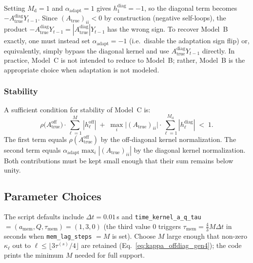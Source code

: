 \documentclass[11pt]{article}
\begin{document}
Setting $M_{\mathrm{d}}=1$ and $\alpha_{\mathrm{adapt}}=1$ gives
$h^{\mathrm{diag}}_1=-1$, so the diagonal term becomes 
$-A_{\text{true}}^{\mathrm{diag}}Y_{t-1}$.
Since $(A_{\text{true}})_{ii}<0$ by construction
(negative self-loops), the product
$-A_{\text{true}}^{\mathrm{diag}}Y_{t-1}
 =|A_{\text{true}}^{\mathrm{diag}}|Y_{t-1}$
has the wrong sign.
To recover Model~B exactly, one must instead set
$\alpha_{\mathrm{adapt}}=-1$ (i.e.\ disable the adaptation sign
flip) or, equivalently, simply bypass the diagonal kernel and use
$A_{\text{true}}^{\mathrm{diag}}Y_{t-1}$ directly.
In practice, Model~C is not intended to reduce to Model~B; rather,
Model~B is the appropriate choice when adaptation is not modeled.

\subsubsection{Stability}

A sufficient condition for stability of Model~C is:
\begin{equation}
  \rho\!\bigl(A_{\text{true}}^{\mathrm{off}}\bigr)
  \cdot\sum_{\ell=1}^{M}|h^{\mathrm{off}}_\ell| 
  \;+\;
  \max_i\bigl|(A_{\text{true}})_{ii}\bigr|
  \cdot\sum_{\ell=1}^{M_{\mathrm{d}}}
        |h^{\mathrm{diag}}_\ell| 
  \;<\; 1.
  \label{eq:stabilityC}
\end{equation}
The first term equals
$\rho(A_{\text{true}}^{\mathrm{off}})$ by the off-diagonal kernel
normalization.
The second term equals
$\alpha_{\mathrm{adapt}}\max_i|(A_{\text{true}})_{ii}|$ by the
diagonal kernel normalization.
Both contributions must be kept small enough that their sum remains
below unity.

\subsection{Parameter Choices}
\label{sec:params}

The script defaults include $\Delta t=0.01$\,s and
\texttt{time\_kernel\_a\_q\_tau} $=(a_{\mathrm{mem}},Q,\tau_{\mathrm{mem}})=(1,3,0)$
(the third value $0$ triggers
$\tau_{\mathrm{mem}}=\tfrac{4}{3}M\Delta t$ in seconds when
\texttt{mem\_lag\_steps} $=M$ is set).
Choose $M$ large enough that non-zero $\kappa_\ell$ out to
$\ell\le \lfloor 3\tau^{(s)}/4\rfloor$ are retained
(Eq.~\ref{eq:kappa_offdiag_gen4}); the code prints the minimum
$M$ needed for full support.
\end{document}
